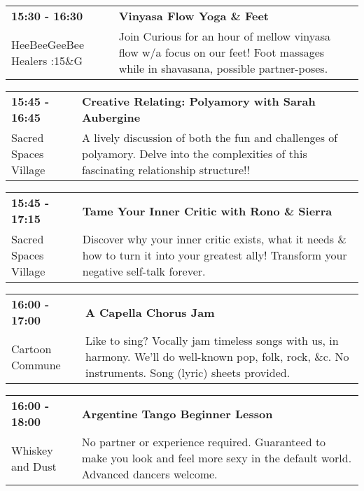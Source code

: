 \begin{tabular}{ p{1in} p{2.2in} }
    \textbf{15:30 - 16:30} & \textbf{Vinyasa Flow Yoga \& Feet} \\
    HeeBeeGeeBee Healers \newline 6:15\&G & Join Curious for an hour of mellow vinyasa flow w/a focus on our feet! Foot massages while in shavasana, possible partner-poses. \\
    \hline 
\end{tabular}
    
\begin{tabular}{ p{1in} p{2.2in} }
    \textbf{15:45 - 16:45} & \textbf{Creative Relating: Polyamory with Sarah Aubergine} \\
    Sacred Spaces Village \newline  & A lively discussion of both the fun and challenges of polyamory. Delve into the complexities of this fascinating relationship structure!! \\
    \hline 
\end{tabular}
    
\begin{tabular}{ p{1in} p{2.2in} }
    \textbf{15:45 - 17:15} & \textbf{Tame Your Inner Critic with Rono \& Sierra} \\
    Sacred Spaces Village \newline  & Discover why your inner critic exists, what it needs \& how to turn it into your greatest ally! Transform your negative self-talk forever. \\
    \hline 
\end{tabular}
    
\begin{tabular}{ p{1in} p{2.2in} }
    \textbf{16:00 - 17:00} & \textbf{A Capella Chorus Jam} \\
    Cartoon Commune \newline  & Like to sing? Vocally jam timeless songs with us, in harmony. We'll do well-known pop, folk, rock, \&c. No instruments. Song (lyric) sheets provided. \\
    \hline 
\end{tabular}
    
\begin{tabular}{ p{1in} p{2.2in} }
    \textbf{16:00 - 18:00} & \textbf{Argentine Tango Beginner Lesson} \\
    Whiskey and Dust \newline  & No partner or experience required. Guaranteed to make you look and feel more sexy in the default world. Advanced dancers welcome. \\
    \hline 
\end{tabular}
    
